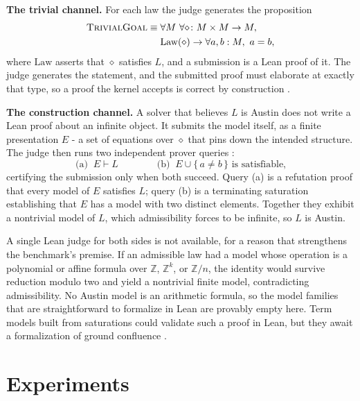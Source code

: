 \documentclass[letterpaper]{article} %
\newcommand{\op}{\diamond}
\begin{document}
\textbf{The trivial channel.} For each law the judge generates the proposition
\begin{equation}
    \label{eq:trivialgoal}
    \begin{aligned}
        \textsc{TrivialGoal} \equiv{}& \forall M\ \forall {\op}\colon M \times M \to M,\\
        & \mathrm{Law}(\op) \rightarrow \forall a, b : M,\ a = b,
    \end{aligned}
\end{equation}
where $\mathrm{Law}$ asserts that $\op$ satisfies $L$, and a submission is a Lean proof of it. The judge generates the statement, and the submitted proof must elaborate at exactly that type, so a proof the kernel accepts is correct by construction \citep{moura2021lean}.

\textbf{The construction channel.} A solver that believes $L$ is Austin does not write a Lean proof about an infinite object. It submits the model itself, as a finite presentation $E$ - a set of equations over $\op$ that pins down the intended structure. The judge then runs two independent prover queries
\citep{kovacs2013first}:
\begin{equation}
    \label{eq:construction}
    \text{(a)}\;\; E \vdash L
    \qquad\qquad
    \text{(b)}\;\; E \cup \{\,a \neq b\,\} \text{ is satisfiable,}
\end{equation}
certifying the submission only when both succeed. Query (a) is a refutation proof that every model of $E$ satisfies $L$; query (b) is a terminating saturation establishing that $E$ has a model with two distinct elements. Together they exhibit a nontrivial model of $L$, which admissibility forces to be infinite, so $L$ is Austin.

A single Lean judge for both sides is not available, for a reason that strengthens the benchmark's premise. If an admissible law had a model whose operation is a polynomial or affine formula over $\mathbb{Z}$, $\mathbb{Z}^k$, or $\mathbb{Z}/n$, the identity would survive reduction modulo two and yield a nontrivial finite model, contradicting admissibility. No Austin model is an arithmetic formula, so the model families that are straightforward to formalize in Lean are provably empty here. Term models built from saturations could validate such a proof in Lean, but they await a formalization of ground confluence \citep{janota2026case}.


\section{Experiments}
\end{document}
